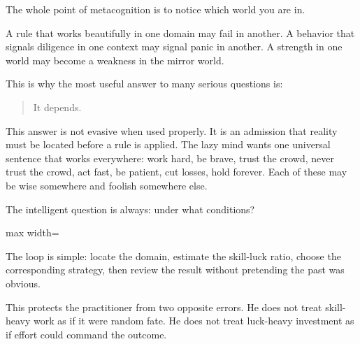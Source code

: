 The whole point of metacognition is to notice which world you are in.

A rule that works beautifully in one domain may fail in another. A behavior that signals diligence in one context may signal panic in another. A strength in one world may become a weakness in the mirror world.

This is why the most useful answer to many serious questions is:

\begin{quote}
It depends.
\end{quote}

This answer is not evasive when used properly. It is an admission that reality must be located before a rule is applied. The lazy mind wants one universal sentence that works everywhere: work hard, be brave, trust the crowd, never trust the crowd, act fast, be patient, cut losses, hold forever. Each of these may be wise somewhere and foolish somewhere else.

The intelligent question is always: under what conditions?

\begin{center}
\begin{adjustbox}{max width=\linewidth}
\end{adjustbox}
\end{center}

The loop is simple: locate the domain, estimate the skill-luck ratio, choose the corresponding strategy, then review the result without pretending the past was obvious.

This protects the practitioner from two opposite errors. He does not treat skill-heavy work as if it were random fate. He does not treat luck-heavy investment as if effort could command the outcome.

